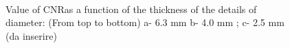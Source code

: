 \documentclass[a4paper]{article}
\begin{document}
\begin{figure}[!hbt]
	\centering
  \quad
  \\
	\caption{ Value of CNRas a function of the thickness of the details of diameter: (From top to bottom) a- 6.3 mm b- 4.0 mm ; c- 2.5 mm (da inserire)}
  \label{fig:ex_four}
\end{figure}
\end{document}
